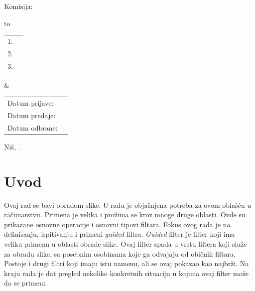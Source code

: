 \documentclass[a4paper,12pt,titlepage]{article}
\begin{document}
\begin{titlepage}
    \vspace{1cm}
   
   \noindent
    Komisija:
    
    \vspace{0.1cm}
    
    \noindent
    \begin{tabu} to   
         \begin{tabular}{@{}ll}
            1. & \underline{\hspace{6.5cm}}\\
            2. & \underline{\hspace{6.5cm}}\\
            3. & \underline{\hspace{6.5cm}}
        \end{tabular}  
        
    &
   
        \begin{tabular}{ll@{}}
            Datum prijave: & \underline{\hspace{3cm}}\\
            Datum predaje: & \underline{\hspace{3cm}}\\
            Datum odbrane: & \underline{\hspace{3cm}}
        \end{tabular}
  
    \end{tabu}
    
    \vspace{4cm}
    
     \begin{center}
        Niš, \the\year.
    \end{center}
\end{titlepage}

\tableofcontents
\thispagestyle{empty}
\newpage


\section{Uvod}%

Ovaj rad se bavi obradom slike. U radu je objašnjena potreba za ovom oblašću u računarstvu. Primena je velika i prožima se kroz mnoge druge oblasti. Ovde su prikazane osnovne operacije i osnovni tipovi filtara. Fokus ovog rada je na definisanju, ispitivanju i primeni \emph{guided} filtra. \emph{Guided} filter je filter koji ima veliku primenu u oblasti obrade slike. Ovaj filter spada u vrstu filtera koji služe za obradu slike, sa posebnim osobinama koje ga odvajaju od običnih filtara. Postoje i drugi filtri koji imaju istu namenu, ali se ovaj pokazao kao najbrži. Na kraju rada je dat pregled nekoliko konkretnih situacija u kojima ovaj filter može da se primeni.
\end{document}
